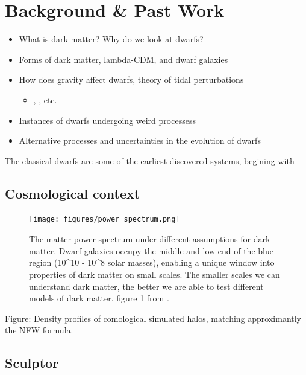 \section{Background \& Past Work}\label{background-past-work}

\begin{itemize}
\tightlist
\item
  What is dark matter? Why do we look at dwarfs?
\item
  Forms of dark matter, lambda-CDM, and dwarf galaxies
\item
  How does gravity affect dwarfs, theory of tidal perturbations

  \begin{itemize}
  \tightlist
  \item
    \citet{EN2021}, \citet{PNM2008}, etc.
  \end{itemize}
\item
  Instances of dwarfs undergoing weird processess
\item
  Alternative processes and uncertainties in the evolution of dwarfs
\end{itemize}

The classical dwarfs are some of the earliest discovered systems,
begining with \citet{shapley1938}

\subsection{Cosmological context}\label{cosmological-context}

\begin{figure}
\centering
\texttt{[image: figures/power\_spectrum.png]}
\caption[Cosmological Power Spectrum]{The matter power spectrum under
different assumptions for dark matter. Dwarf galaxies occupy the middle
and low end of the blue region (10\^{}10 - 10\^{}8 solar masses),
enabling a unique window into properties of dark matter on small scales.
The smaller scales we can understand dark matter, the better we are able
to test different models of dark matter. figure 1 from
\citet{bechtol+2022}.}\label{fig:cosmological_power_spectrum}
\end{figure}

Figure: Density profiles of comological simulated halos, matching
approximantly the NFW formula.

\subsection{Sculptor}\label{sculptor}

